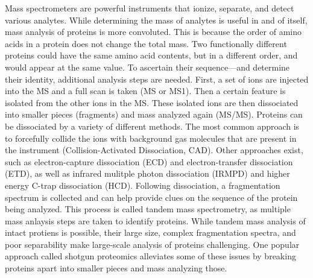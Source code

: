 Mass spectrometers are powerful instruments that ionize, separate, and detect various analytes. While determining the mass of analytes is useful in and of itself, mass analysis of proteins is more convoluted. This is because the order of amino acids in a protein does not change the total mass. Two functionally different proteins could have the same amino acid contents, but in a different order, and would appear at the same \mz{} value. To ascertain their sequence---and determine their identity, additional analysis steps are needed. First, a set of ions are injected into the MS and a full scan is taken (MS or MS1). Then a certain \mz{} feature is isolated from the other ions in the MS. These isolated ions are then dissociated into smaller pieces (fragments) and mass analyzed again (MS/MS). Proteins can be dissociated by a variety of different methods. The most common approach is to forcefully collide the ions with background gas molecules that are present in the instrument (Collision-Activated Dissociation, CAD). Other approaches exist, such as electron-capture dissociation (ECD)\cite{ecd} and electron-transfer dissociation (ETD)\cite{etd}, as well as infrared mulitple photon dissociation (IRMPD)\cite{irmpd} and higher energy C-trap dissociation (HCD)\cite{hcd}. Following dissociation, a fragmentation spectrum is collected and can help provide clues on the sequence of the protein being analyzed. This process is called tandem mass spectrometry, as multiple mass anlaysis steps are taken to identify proteins. While tandem mass analysis of intact protiens is possible, their large size, complex fragmentation spectra, and poor separability make large-scale analysis of proteins challenging. One popular approach called shotgun proteomics alleviates some of these issues by breaking proteins apart into smaller pieces and mass analyzing those.

